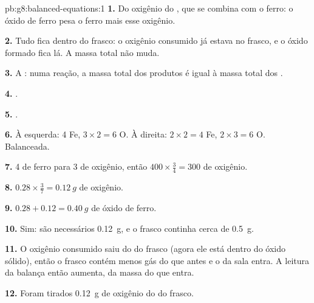 \begin{solution}{pb:g8:balanced-equations:1}
\textbf{1.} Do oxigênio do , que se combina com o ferro: o óxido de
ferro pesa o ferro mais esse oxigênio.

\textbf{2.} Tudo fica dentro do frasco: o oxigênio consumido já estava
no frasco, e o óxido formado fica lá. A massa total não muda.

\textbf{3.} A : numa reação, a massa total dos
produtos é igual à massa total dos .

\textbf{4.} .

\textbf{5.} .

\textbf{6.} À esquerda: 4 Fe, $3 \times 2 = 6$ O. À direita: $2 \times 2 = 4$ Fe,
$2 \times 3 = 6$ O. Balanceada.

\textbf{7.} 4  de ferro para 3  de oxigênio, então $400 \times
\frac{3}{4} = 300$  de oxigênio.

\textbf{8.} $0.28 \times \frac{3}{7} = \qty{0.12}{g}$ de oxigênio.

\textbf{9.} $0.28 + 0.12 = \qty{0.40}{g}$ de óxido de ferro.

\textbf{10.} Sim: são necessários \qty{0.12}{g}, e o frasco continha
cerca de \qty{0.5}{g}.

\textbf{11.} O oxigênio consumido saiu do  do frasco (agora ele está
dentro do óxido sólido), então o frasco contém menos gás do que antes e
o  da sala entra. A leitura da balança então aumenta, da massa do 
que entra.

\textbf{12.} Foram tirados \qty{0.12}{g} de oxigênio do  do frasco.
\end{solution}
